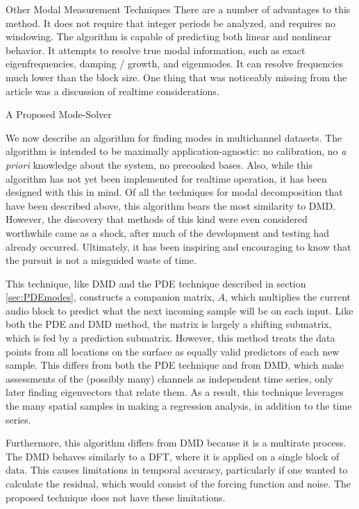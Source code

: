 \documentclass[a4paper,10pt]{report}
\numberwithin{equation}{section}
\begin{document}
{\begin{chapter}
\begin{section}{Other Modal Measurement Techniques}
There are a number of advantages to this method. It does not require that integer periods be analyzed, and requires no windowing. The algorithm is capable of predicting both linear and nonlinear behavior. It attempts to resolve true modal information, such as exact eigenfrequencies, damping / growth, and eigenmodes. It can resolve frequencies much lower than the block size. One thing that was noticeably missing from the article was a discussion of realtime considerations. \cite{Chen2012}
\end{section}
\begin{section}{A Proposed Mode-Solver}
\par
We now describe an algorithm for finding modes in multichannel datasets. The algorithm is intended to be maximally application-agnostic: no calibration, no \emph{a priori} knowledge about the system, no precooked bases. Also, while this algorithm has not yet been implemented for realtime operation, it has been designed with this in mind. Of all the techniques for modal decomposition that have been described above, this algorithm bears the most similarity to DMD. However, the discovery that methods of this kind were even considered worthwhile came as a shock, after much of the development and testing had already occurred. Ultimately, it has been inspiring and encouraging to know that the pursuit is not a misguided waste of time.
\par
This technique, like DMD and the PDE technique described in section \ref{sec:PDEmodes}, constructs a companion matrix, $A$, which multiplies the current audio block to predict what the next incoming sample will be on each input. Like both the PDE and DMD method, the matrix is largely a shifting submatrix, which is fed by a prediction submatrix. However, this method treats the data points from all locations on the surface as equally valid predictors of each new sample. This differs from both the PDE technique and from DMD, which make assessments of the (possibly many) channels as independent time series, only later finding eigenvectors that relate them. As a result, this technique leverages the many spatial samples in making a regression analysis, in addition to the time series. 
\par
Furthermore, this algorithm differs from DMD because it is a multirate process. The DMD behaves similarly to a DFT, where it is applied on a single block of data. This causes limitations in temporal accuracy, particularly if one wanted to calculate the residual, which would consist of the forcing function and noise. The proposed technique does not have these limitations.

\end{section}
\end{chapter}}
\end{document}
